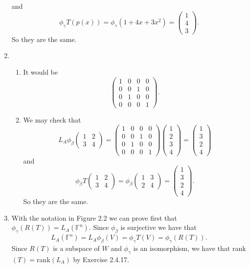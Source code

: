 \begin{enumerate}
and 
\[\phi_{\gamma}T(p(x))=\phi_{\gamma}(1+4x+3x^2)=\left(\begin{array}{c}1\\4\\3\end{array}\right).\]
So they are the same.
\item \begin{enumerate}
\item It would be 
\[\left(\begin{array}{cccc}1&0&0&0\\0&0&1&0\\0&1&0&0\\0&0&0&1\end{array}\right).\]
\item We may check that 
\[L_A\phi_{\beta}\left(\begin{array}{cc}1&2\\3&4\end{array}\right)=\left(\begin{array}{cccc}1&0&0&0\\0&0&1&0\\0&1&0&0\\0&0&0&1\end{array}\right)\left(\begin{array}{c}1\\2\\3\\4\end{array}\right)=\left(\begin{array}{c}1\\3\\2\\4\end{array}\right)\]
and 
\[\phi_{\beta}T\left(\begin{array}{cc}1&2\\3&4\end{array}\right)=\phi_{\beta}\left(\begin{array}{cc}1&3\\2&4\end{array}\right)=\left(\begin{array}{c}1\\3\\2\\4\end{array}\right).\]
So they are the same.
\end{enumerate}
\item With the notation in Figure 2.2 we can prove first that $\phi_{\gamma}(R(T))=L_A(\mathbb{F}^n)$. Since $\phi_{\beta}$ is surjective we have that 
\[L_A(\mathbb{F}^n)=L_A\phi_{\beta}(V)=\phi_{\gamma}T(V)=\phi_{\gamma}(R(T)).\]
Since $R(T)$ is a subspace of $W$ and $\phi_{\gamma}$ is an isomorphism, we have that rank$(T)=$rank$(L_A)$ by Exercise 2.4.17.


\end{enumerate}
